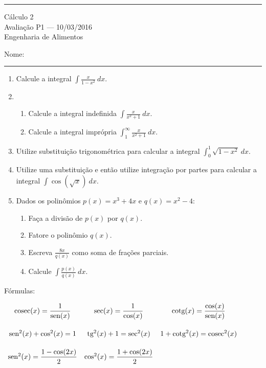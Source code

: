\documentclass{article}
\newcommand{\sen}{\mbox{sen}}
\newcommand{\tg}{\mbox{tg}}
\newcommand{\cosec}{\mbox{cosec}}
\newcommand{\cotg}{\mbox{cotg}}
\begin{document}
\noindent{}\rule{\textwidth}{0.4pt}
\begin{center}
	C\'alculo 2\\
	Avalia\c{c}\~ao P1 --- 10/03/2016 \\
	Engenharia de Alimentos \\
	\vspace{0.2cm}
\end{center}
Nome: \\
\noindent{}\rule{\textwidth}{0.4pt}

\begin{enumerate}
\item Calcule a integral $\displaystyle\int \frac{x}{1-x^2}\ dx$.

\item
	\begin{enumerate}
		\item Calcule a integral indefinida $\displaystyle\int \frac{x}{x^2+1}\ dx$.
		\item Calcule a integral impr\'opria $\displaystyle\int_1^\infty \frac{x}{x^2+1}\ dx$.
	\end{enumerate}

\item Utilize substitui\c{c}\~ao trigonom\'etrica para calcular a integral $\displaystyle\int_0^1 \sqrt{1-x^2}\ dx$.

\item Utilize uma substitui\c{c}\~ao e ent\~ao utilize integra\c{c}\~ao por partes para calcular a integral $\displaystyle\int\cos(\sqrt{x})\ dx$.

\item Dados os polin\^omios $p(x) = x^3+4x$ e $q(x)=x^2-4$:
	\begin{enumerate}
		\item Fa\c{c}a a divis\~ao de $p(x)$ por $q(x)$.
		\item Fatore o polin\^omio $q(x)$.
		\item Escreva $\displaystyle\frac{8x}{q(x)}$ como soma de fra\c{c}\~oes parciais.
		\item Calcule $\displaystyle\int\frac{p(x)}{q(x)}\ dx$.
	\end{enumerate}

\end{enumerate}
F\'ormulas:

$\begin{array}{ccc}
	\vspace{0.5cm}
	\cosec(x) = \displaystyle\frac{1}{\sen(x)} & \sec(x) = \displaystyle\frac{1}{\cos(x)} & \cotg(x) = \displaystyle\frac{\cos(x)}{\sen(x)} \\
	\vspace{0.5cm}
	\sen^2(x) + \cos^2(x) = 1 & \tg^2(x) + 1 = \sec^2(x) & 1 + \cotg^2(x) = \cosec^2(x) \\
	\vspace{0.5cm}
	\sen^2(x) = \displaystyle\frac{1 - \cos(2x)}{2} & \cos^2(x) = \displaystyle\frac{1 + \cos(2x)}{2} &
\end{array}$
\end{document}
